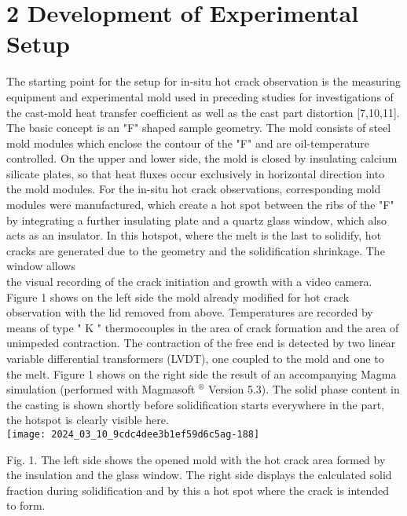 \documentclass[10pt]{article}
\begin{document}
\section*{2 Development of Experimental Setup}
The starting point for the setup for in-situ hot crack observation is the measuring equipment and experimental mold used in preceding studies for investigations of the cast-mold heat transfer coefficient as well as the cast part distortion [7,10,11]. The basic concept is an "F" shaped sample geometry. The mold consists of steel mold modules which enclose the contour of the "F" and are oil-temperature controlled. On the upper and lower side, the mold is closed by insulating calcium silicate plates, so that heat fluxes occur exclusively in horizontal direction into the mold modules. For the in-situ hot crack observations, corresponding mold modules were manufactured, which create a hot spot between the ribs of the "F" by integrating a further insulating plate and a quartz glass window, which also acts as an insulator. In this hotspot, where the melt is the last to solidify, hot cracks are generated due to the geometry and the solidification shrinkage. The window allows\\
the visual recording of the crack initiation and growth with a video camera. Figure 1 shows on the left side the mold already modified for hot crack observation with the lid removed from above. Temperatures are recorded by means of type " $\mathrm{K}$ " thermocouples in the area of crack formation and the area of unimpeded contraction. The contraction of the free end is detected by two linear variable differential transformers (LVDT), one coupled to the mold and one to the melt. Figure 1 shows on the right side the result of an accompanying Magma simulation (performed with Magmasoft ${ }^{\circledR}$ Version 5.3). The solid phase content in the casting is shown shortly before solidification starts everywhere in the part, the hotspot is clearly visible here.\\
\texttt{[image: 2024\_03\_10\_9cdc4dee3b1ef59d6c5ag-188]}

Fig. 1. The left side shows the opened mold with the hot crack area formed by the insulation and the glass window. The right side displays the calculated solid fraction during solidification and by this a hot spot where the crack is intended to form.
\end{document}
